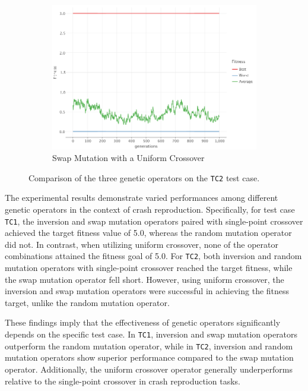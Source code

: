 \begin{figure}[ht!]
\begin{subfigure}{0.45\textwidth}
            \includegraphics[width=\textwidth]{img/beacon_uniform_swap_2.png}
            \caption{Swap Mutation with a Uniform Crossover}
            \label{fig:beacon:4:swap}
        \end{subfigure}
        \caption{Comparison of the three genetic operators on the \texttt{TC2} test case.}
        \label{fig:beacon:4}
    \end{figure}

    The experimental results demonstrate varied performances among different genetic operators in the context of crash 
    reproduction. Specifically, for test case \texttt{TC1}, the inversion and swap mutation operators paired with 
    single-point crossover achieved the target fitness value of 5.0, whereas the random mutation operator did not. In 
    contrast, when utilizing uniform crossover, none of the operator combinations attained the fitness goal of 5.0. For 
    \texttt{TC2}, both inversion and random mutation operators with single-point crossover reached the target fitness, 
    while the swap mutation operator fell short. However, using uniform crossover, the inversion and swap mutation 
    operators were successful in achieving the fitness target, unlike the random mutation operator.

    These findings imply that the effectiveness of genetic operators significantly depends on the specific test case. In 
    \texttt{TC1}, inversion and swap mutation operators outperform the random mutation operator, while in \texttt{TC2}, 
    inversion and random mutation operators show superior performance compared to the swap mutation operator. 
    Additionally, the uniform crossover operator generally underperforms relative to the single-point crossover in crash 
    reproduction tasks.

